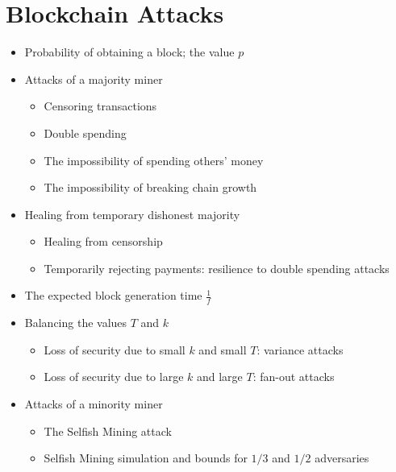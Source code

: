 \chapter{Blockchain Attacks}

{\color{red}
\begin{itemize}
\item Probability of obtaining a block; the value $p$
\item Attacks of a majority miner
    \begin{itemize}
    \item Censoring transactions
    \item Double spending
    \item The impossibility of spending others' money
    \item The impossibility of breaking chain growth
    \end{itemize}
\item Healing from temporary dishonest majority
    \begin{itemize}
    \item Healing from censorship
    \item Temporarily rejecting payments: resilience to double spending attacks
    \end{itemize}
\item The expected block generation time $\frac{1}{f}$
\item Balancing the values $T$ and $k$
    \begin{itemize}
    \item Loss of security due to small $k$ and small $T$: variance attacks
    \item Loss of security due to large $k$ and large $T$: fan-out attacks
    \end{itemize}

\item Attacks of a minority miner
    \begin{itemize}
    \item The Selfish Mining attack
    \item Selfish Mining simulation and bounds for $1/3$ and $1/2$ adversaries
    \end{itemize}
\end{itemize}
}

